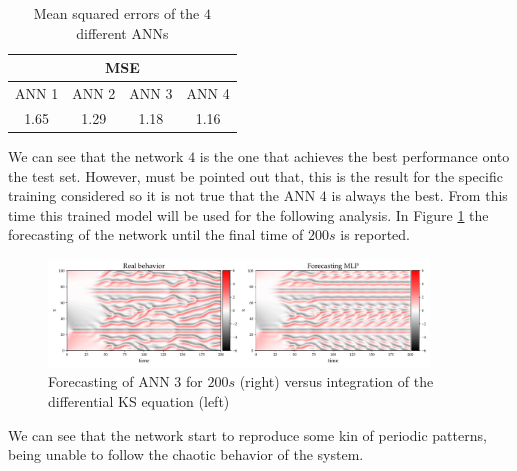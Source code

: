 \documentclass[]{article}
\begin{document}
\begin{table}[!b]
	\begin{centering}
	\begin{tabular}{cccc}
		\hline
		\multicolumn{4}{c}{MSE}       \\ \hline
		ANN 1 & ANN 2 & ANN 3 & ANN 4 \\ \hline
		1.65  & 1.29  & 1.18  & 1.16  \\ \hline
	\end{tabular}
\caption{Mean squared errors of the $4$ different ANNs}
\label{table:1}
\end{centering}
\end{table}
We can see that the network $4$ is the one that achieves the best performance onto the test set. However, must be pointed out that, this is the result for the specific training considered so it is not true that the ANN $4$ is always the best. From this time this trained model will be used for the following analysis. In Figure \ref{fig:fig8} the forecasting of the network until the final time of $200s$ is reported.
\begin{figure}[!t]
	\centering
	\includegraphics[width=0.9\textwidth]{../figures/fore.pdf}
	\caption{Forecasting of ANN 3 for $200 s$ (right) versus integration of the differential KS equation (left)}
	\label{fig:fig8}
\end{figure}
We can see that the network start to reproduce some kin of periodic patterns, being unable to follow the chaotic behavior of the system.
\end{document}

